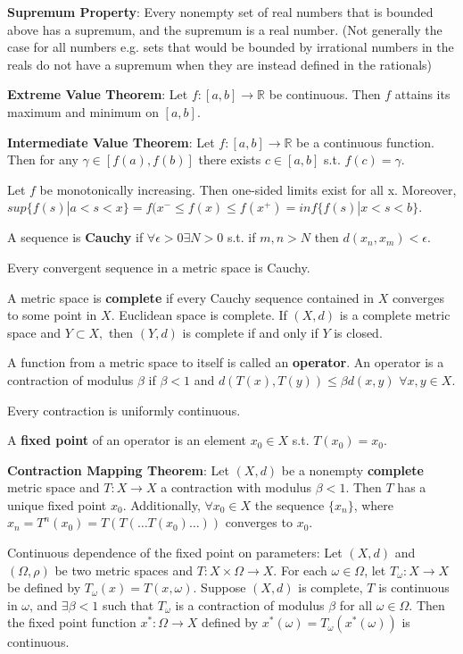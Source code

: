 \documentclass[11pt]{article} %
\begin{document}
\textbf{Supremum Property}: Every nonempty set of real numbers that is bounded above has a supremum, and the supremum is a real number. (Not generally the case for all numbers e.g. sets that would be bounded by irrational numbers in the reals do not have a supremum when they are instead defined in the rationals)

\textbf{Extreme Value Theorem}: Let $f:[a,b]\rightarrow \mathbb{R}$ be continuous. Then $f$ attains its maximum and minimum on $[a,b]$.

\textbf{Intermediate Value Theorem}: Let $f:[a,b]\rightarrow \mathbb{R}$ be a continuous function. Then for any $\gamma \in [f(a),f(b)]$ there exists $c \in [a,b]$ s.t. $f(c) = \gamma$.

Let $f$ be monotonically increasing. Then one-sided limits exist for all x. Moreover, $sup\{f(s)|a<s<x\} = f(x^{-} \leq f(x) \leq f(x^{+}) = inf\{ f(s)|x<s<b\}$.

A sequence is \textbf{Cauchy} if $\forall \epsilon > 0 \exists N > 0$ s.t. if $m,n>N$ then $d(x_n,x_m)<\epsilon.$

Every convergent sequence in a metric space is Cauchy.

A metric space is \textbf{complete} if every Cauchy sequence contained in $X$ converges to some point in $X$. Euclidean space is complete. If $(X,d)$ is a complete metric space and $Y \subset X,$ then $(Y,d)$ is complete if and only if $Y$ is closed.

A function from a metric space to itself is called an \textbf{operator}. An operator is a contraction of modulus $\beta$ if $\beta < 1$ and $d(T(x),T(y)) \leq \beta d(x,y)$ $\forall x,y \in X.$

Every contraction is uniformly continuous.

A \textbf{fixed point} of an operator is an element $x_0 \in X$ s.t. $T(x_0) = x_0$.

\textbf{Contraction Mapping Theorem}: Let $(X,d)$ be a nonempty \textbf{complete} metric space and $T:X \rightarrow X$ a contraction with modulus $\beta<1$. Then $T$ has a unique fixed point $x_0$. Additionally, $\forall x_0 \in X$ the sequence $\{ x_n\}$, where $x_n = T^n(x_0) = T(T(\dots T(x_0)\dots ))$ converges to $x_0$.

Continuous dependence of the fixed point on parameters: Let $(X,d)$ and $(\Omega,\rho)$ be two metric spaces and $T:X \times \Omega \rightarrow X.$ For each $\omega \in \Omega$, let $T_{\omega}: X \rightarrow X$ be defined by $T_{\omega}(x) = T(x,\omega)$. Suppose $(X,d)$ is complete, $T$ is continuous in $\omega$, and $\exists \beta < 1$ such that $T_{\omega}$ is a contraction of modulus $\beta$ for all $\omega \in \Omega.$ Then the fixed point function $x^* : \Omega \rightarrow X$ defined by $x^*(\omega) = T_{\omega}(x^*(\omega))$ is continuous.
\end{document}
